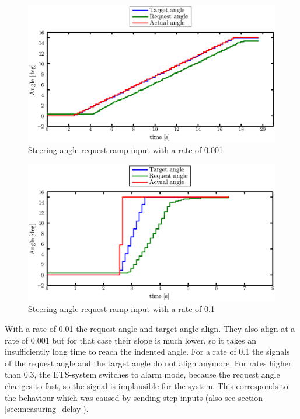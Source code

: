 \documentclass[ExampleMasters.tex]{subfiles}
\begin{document}
\begin{figure}[!hbt]
	\centering
	\includegraphics[width=1\linewidth]{figures/rate_limiter2}
	\caption{Steering angle request ramp input with a rate of 0.001}
	
	\label{fig:rate_limiter2}
\end{figure}
\begin{figure}[!hbt]
	\centering
	\includegraphics[width=1\linewidth]{figures/rate_limiter3}
	\caption{Steering angle request ramp input with a rate of 0.1}
	
	\label{fig:rate_limiter3}
\end{figure}

With a rate of 0.01 the request angle and target angle align. They also align at a rate of 0.001 but for that case their slope is much lower, so it takes an insufficiently long time to reach the indented angle. For a rate of 0.1 the signals of the request angle and the target angle do not align anymore. For rates higher than 0.3, the \gls{ETS}-system switches to alarm mode, because the request angle changes to fast, so the signal is implausible for the system. This corresponds to the behaviour which was caused by sending step inputs (also see section \ref{sec:measuring_delay}).
\end{document}
